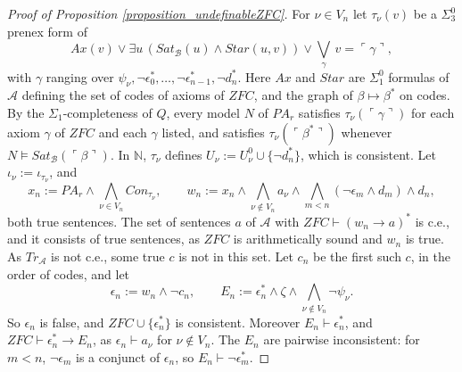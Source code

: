 \documentclass{amsart}  %
\numberwithin{equation}{section}
\theoremstyle{definition}
\theoremstyle{remark}
\begin{document}
\begin{proof} [Proof of Proposition \ref{proposition_undefinableZFC}]
For $\nu \in V _{n}$ let $\tau _{\nu} (v)$ be a $\Sigma ^{0} _{3}$ prenex form of
$$Ax (v) \lor \exists u \, \left( Sat _{\mathcal{B}} (u) \land Star (u, v) \right) \lor \bigvee _{\gamma} \, v = \ulcorner \gamma \urcorner,$$
with $\gamma$ ranging over $\psi _{\nu}, \neg \epsilon _{0} ^{\ast}, \ldots, \neg \epsilon _{n-1} ^{\ast}, \neg d _{n} ^{\ast}$. Here $Ax$ and $Star$ are $\Sigma ^{0} _{1}$ formulas of $\mathcal{A}$ defining the set of codes of axioms of $ZFC$, and the graph of $\beta \mapsto \beta ^{\ast}$ on codes. By the $\Sigma _{1}$-completeness of $Q$, every model $N$ of $PA _{r}$ satisfies $\tau _{\nu} (\ulcorner \gamma \urcorner)$ for each axiom $\gamma$ of $ZFC$ and each $\gamma$ listed, and satisfies $\tau _{\nu} (\ulcorner \beta ^{\ast} \urcorner)$ whenever $N \models Sat _{\mathcal{B}} (\ulcorner \beta \urcorner)$. In $\mathbb{N}$, $\tau _{\nu}$ defines $U _{\nu} := U ^{0} _{\nu} \cup \{\neg d _{n} ^{\ast}\}$, which is consistent. Let $\iota _{\nu} := \iota _{\tau _{\nu}}$, and
$$x _{n} := PA _{r} \land \bigwedge _{\nu \in V _{n}} Con _{\tau _{\nu}}, \qquad w _{n} := x _{n} \land \bigwedge _{\nu \notin V _{n}} a _{\nu} \land \bigwedge _{m < n} (\neg \epsilon _{m} \land d _{m}) \land d _{n},$$
both true sentences. The set of sentences $a$ of $\mathcal{A}$ with $ZFC \vdash (w _{n} \to a) ^{\ast}$ is c.e., and it consists of true sentences, as $ZFC$ is arithmetically sound and $w _{n}$ is true. As $Tr _{\mathcal{A}}$ is not c.e., some true $c$ is not in this set. Let $c _{n}$ be the first such $c$, in the order of codes, and let
$$\epsilon _{n} := w _{n} \land \neg c _{n}, \qquad E _{n} := \epsilon _{n} ^{\ast} \land \zeta \land \bigwedge _{\nu \notin V _{n}} \neg \psi _{\nu}.$$
So $\epsilon _{n}$ is false, and $ZFC \cup \{\epsilon _{n} ^{\ast}\}$ is consistent. Moreover $E _{n} \vdash \epsilon _{n} ^{\ast}$, and $ZFC \vdash \epsilon _{n} ^{\ast} \to E _{n}$, as $\epsilon _{n} \vdash a _{\nu}$ for $\nu \notin V _{n}$. The $E _{n}$ are pairwise inconsistent: for $m < n$, $\neg \epsilon _{m}$ is a conjunct of $\epsilon _{n}$, so $E _{n} \vdash \neg \epsilon _{m} ^{\ast}$.


\end{proof}
\end{document}
